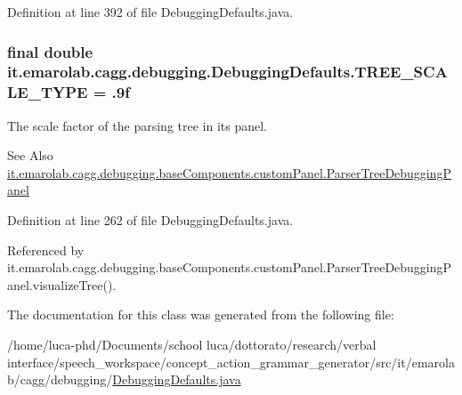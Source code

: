 Definition at line 392 of file Debugging\-Defaults.\-java.

\hypertarget{classit_1_1emarolab_1_1cagg_1_1debugging_1_1DebuggingDefaults_a63d086f918822ab4a3e70f62b6a5f8a2}{
\subsubsection[{T\-R\-E\-E\-\_\-\-S\-C\-A\-L\-E\-\_\-\-T\-Y\-P\-E}]{\setlength{\rightskip}{0pt plus 5cm}final double it.\-emarolab.\-cagg.\-debugging.\-Debugging\-Defaults.\-T\-R\-E\-E\-\_\-\-S\-C\-A\-L\-E\-\_\-\-T\-Y\-P\-E = .\-9f\hspace{0.3cm}{\ttfamily [static]}}}\label{classit_1_1emarolab_1_1cagg_1_1debugging_1_1DebuggingDefaults_a63d086f918822ab4a3e70f62b6a5f8a2}
The scale factor of the parsing tree in its panel. \begin{DoxySeeAlso}{See Also}
\hyperlink{classit_1_1emarolab_1_1cagg_1_1debugging_1_1baseComponents_1_1customPanel_1_1ParserTreeDebuggingPanel}{it.\-emarolab.\-cagg.\-debugging.\-base\-Components.\-custom\-Panel.\-Parser\-Tree\-Debugging\-Panel} 
\end{DoxySeeAlso}


Definition at line 262 of file Debugging\-Defaults.\-java.



Referenced by it.\-emarolab.\-cagg.\-debugging.\-base\-Components.\-custom\-Panel.\-Parser\-Tree\-Debugging\-Panel.\-visualize\-Tree().



The documentation for this class was generated from the following file\-:\begin{DoxyCompactItemize}
\item 
/home/luca-\/phd/\-Documents/school luca/dottorato/research/verbal interface/speech\-\_\-workspace/concept\-\_\-action\-\_\-grammar\-\_\-generator/src/it/emarolab/cagg/debugging/\hyperlink{DebuggingDefaults_8java}{Debugging\-Defaults.\-java}\end{DoxyCompactItemize}
